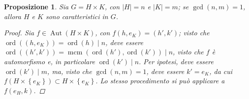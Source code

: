 \documentclass[12pt]{scrartcl}
\theoremstyle{style}
\newtheorem{prop}{Proposizione}[section]
\numberwithin{equation}{subsection}
\begin{document}
\begin{prop}
	Sia $G = H\times K$, con $\lvert H \rvert = n$ e $\lvert K \rvert = m$; se $\operatorname{gcd}(n,m) =1$, allora $H$ e $K$ sono caratteristici in $G$.
	\begin{proof}
		Sia $f \in \operatorname{Aut} (H \times K)$, con $f(h,e_K) = (h',k')$; visto che $\operatorname{ord}((h,e_K)) = \operatorname{ord}(h)  \mid n$, deve essere $\operatorname{ord}((h',k')) = \operatorname{mcm} (\operatorname{ord}(h') ,\operatorname{ord}(k') )  \mid n$, visto che $f$ \`e automorfismo e, in particolare $\operatorname{ord}(k')  \mid n$.
		Per ipotesi, deve essere $\operatorname{ord}(k')  \mid m $, ma, visto che $\operatorname{gcd}(n,m) =1 $, deve essere $k' = e_K$, da cui $f(H \times \left\{ e_K \right\} ) \subset H \times \left\{ e_K \right\} $.
		Lo stesso procedimento si pu\`o applicare a $f(e_H, k)$.
	\end{proof}
\end{prop}
\end{document}
